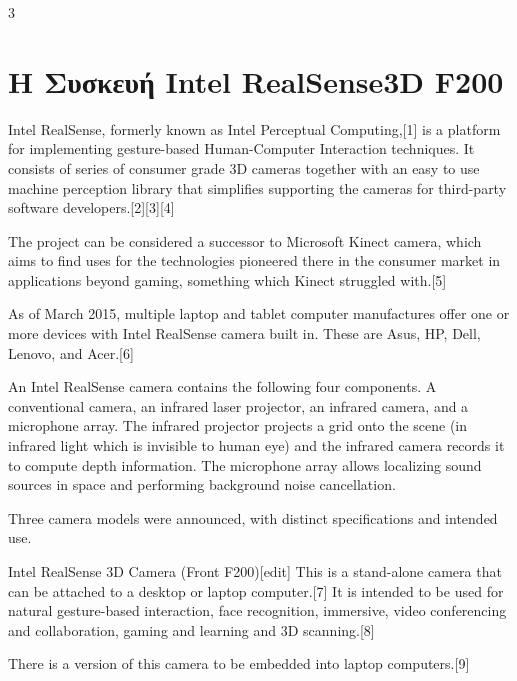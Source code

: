 3%


 \label{c:crypto}


\section{Η Συσκευή Intel RealSense\textregistered 3D F200 }

Intel RealSense\textregistered, formerly known as Intel Perceptual Computing,[1] is a platform for implementing gesture-based Human-Computer Interaction techniques. It consists of series of consumer grade 3D cameras together with an easy to use machine perception library that simplifies supporting the cameras for third-party software developers.[2][3][4]

The project can be considered a successor to Microsoft Kinect camera, which aims to find uses for the technologies pioneered there in the consumer market in applications beyond gaming, something which Kinect struggled with.[5]

As of March 2015, multiple laptop and tablet computer manufactures offer one or more devices with Intel RealSense camera built in. These are Asus, HP, Dell, Lenovo, and Acer.[6]

An Intel RealSense camera contains the following four components. A conventional camera, an infrared laser projector, an infrared camera, and a microphone array. The infrared projector projects a grid onto the scene (in infrared light which is invisible to human eye) and the infrared camera records it to compute depth information. The microphone array allows localizing sound sources in space and performing background noise cancellation.

Three camera models were announced, with distinct specifications and intended use.

Intel RealSense 3D Camera (Front F200)[edit]
This is a stand-alone camera that can be attached to a desktop or laptop computer.[7] It is intended to be used for natural gesture-based interaction, face recognition, immersive, video conferencing and collaboration, gaming and learning and 3D scanning.[8]

There is a version of this camera to be embedded into laptop computers.[9]

